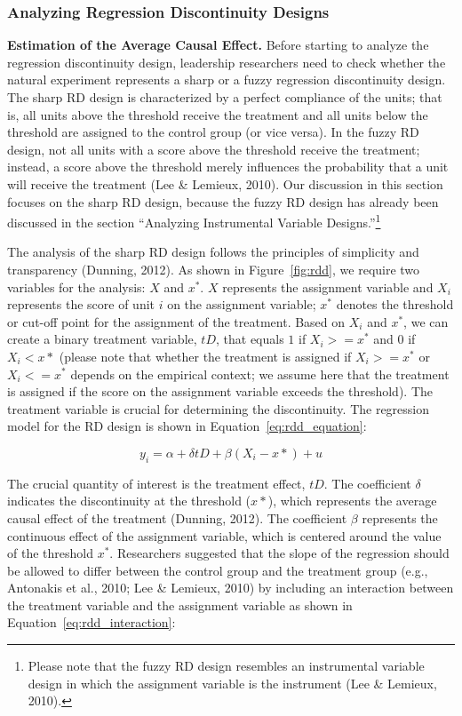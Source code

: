 \documentclass[english]{article}
\begin{document}
\subsubsection{Analyzing Regression Discontinuity Designs}

\noindent \textbf{Estimation of the Average Causal Effect.}
Before starting to analyze the regression discontinuity design,
leadership researchers need to check whether the natural experiment
represents a sharp or a fuzzy regression discontinuity design. The sharp
RD design is characterized by a perfect compliance of the units; that
is, all units above the threshold receive the treatment and all units
below the threshold are assigned to the control group (or vice versa).
In the fuzzy RD design, not all units with a score above the threshold
receive the treatment; instead, a score above the threshold merely
influences the probability that a unit will receive the treatment (Lee
\& Lemieux, 2010). Our discussion in this section focuses on the sharp
RD design, because the fuzzy RD design has already been discussed in the
section ``Analyzing Instrumental Variable Designs.''\footnote{Please
  note that the fuzzy RD design resembles an instrumental variable
  design in which the assignment variable is the instrument (Lee \&
  Lemieux, 2010).}

The analysis of the sharp RD design follows the principles of simplicity and
transparency (Dunning, 2012). As shown in Figure~\ref{fig:rdd}, we require two
variables for the analysis: $X$ and $x^{*}$. $X$ represents the assignment
variable and $X_{i}$ represents the score of unit $i$ on the assignment
variable; $x^{*}$ denotes the threshold or cut-off point for the assignment of
the treatment. Based on $X_{i}$ and $x^{*}$, we can create a binary treatment
variable, $tD$, that equals $1$ if $X_{i} >= x^{*}$ and $0$ if $X_{i} < x*$
(please note that whether the treatment is assigned if $X_{i} >= x^{*}$ or
	$X_{i} <= x^{*}$ depends on the empirical context; we assume here that
	the treatment is assigned if the score on the assignment variable
exceeds the threshold). The treatment variable is crucial for determining the
discontinuity. The regression model for the RD design is shown in
Equation~\ref{eq:rdd_equation}:

\begin{equation}
        y_{i} = \alpha + \delta t D + \beta(X_{i} - x*) + u
	\label{eq:rdd_equation}
\end{equation}

The crucial quantity of interest is the treatment effect, $tD$. The coefficient
$\delta$ indicates the discontinuity at the threshold ($x*$), which represents
the average causal effect of the treatment (Dunning, 2012).  The coefficient
$\beta$ represents the continuous effect of the assignment variable, which is
centered around the value of the threshold $x^{*}$.  Researchers suggested that
the slope of the regression should be allowed to differ between the control
group and the treatment group (e.g., Antonakis et al., 2010; Lee \& Lemieux,
2010) by including an interaction between the treatment variable and the
assignment variable as shown in Equation~\ref{eq:rdd_interaction}:
\end{document}
